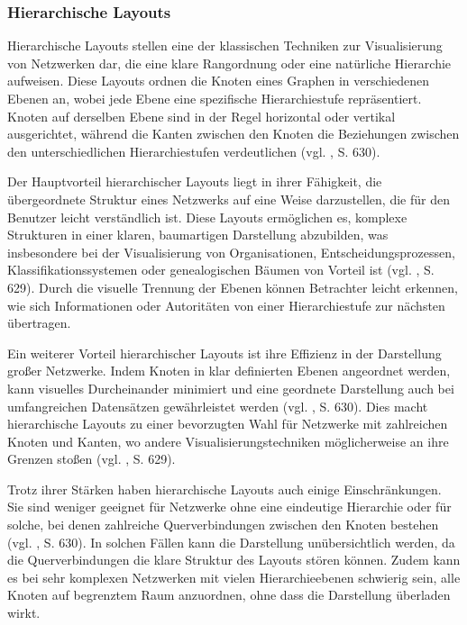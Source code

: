 \subsubsection{Hierarchische Layouts}

Hierarchische Layouts stellen eine der klassischen Techniken zur Visualisierung von Netzwerken dar, die eine klare Rangordnung oder eine natürliche Hierarchie aufweisen. Diese Layouts ordnen die Knoten eines Graphen in verschiedenen Ebenen an, wobei jede Ebene eine spezifische Hierarchiestufe repräsentiert. Knoten auf derselben Ebene sind in der Regel horizontal oder vertikal ausgerichtet, während die Kanten zwischen den Knoten die Beziehungen zwischen den unterschiedlichen Hierarchiestufen verdeutlichen (vgl. \cite{chen:SurveyGraphVisualization}, S. 630).

Der Hauptvorteil hierarchischer Layouts liegt in ihrer Fähigkeit, die übergeordnete Struktur eines Netzwerks auf eine Weise darzustellen, die für den Benutzer leicht verständlich ist. Diese Layouts ermöglichen es, komplexe Strukturen in einer klaren, baumartigen Darstellung abzubilden, was insbesondere bei der Visualisierung von Organisationen, Entscheidungsprozessen, Klassifikationssystemen oder genealogischen Bäumen von Vorteil ist (vgl. \cite{chen:SurveyGraphVisualization}, S. 629). Durch die visuelle Trennung der Ebenen können Betrachter leicht erkennen, wie sich Informationen oder Autoritäten von einer Hierarchiestufe zur nächsten übertragen.

Ein weiterer Vorteil hierarchischer Layouts ist ihre Effizienz in der Darstellung großer Netzwerke. Indem Knoten in klar definierten Ebenen angeordnet werden, kann visuelles Durcheinander minimiert und eine geordnete Darstellung auch bei umfangreichen Datensätzen gewährleistet werden (vgl. \cite{chen:SurveyGraphVisualization}, S. 630). Dies macht hierarchische Layouts zu einer bevorzugten Wahl für Netzwerke mit zahlreichen Knoten und Kanten, wo andere Visualisierungstechniken möglicherweise an ihre Grenzen stoßen (vgl. \cite{chen:SurveyGraphVisualization}, S. 629).

Trotz ihrer Stärken haben hierarchische Layouts auch einige Einschränkungen. Sie sind weniger geeignet für Netzwerke ohne eine eindeutige Hierarchie oder für solche, bei denen zahlreiche Querverbindungen zwischen den Knoten bestehen (vgl. \cite{chen:SurveyGraphVisualization}, S. 630). In solchen Fällen kann die Darstellung unübersichtlich werden, da die Querverbindungen die klare Struktur des Layouts stören können. Zudem kann es bei sehr komplexen Netzwerken mit vielen Hierarchieebenen schwierig sein, alle Knoten auf begrenztem Raum anzuordnen, ohne dass die Darstellung überladen wirkt.

